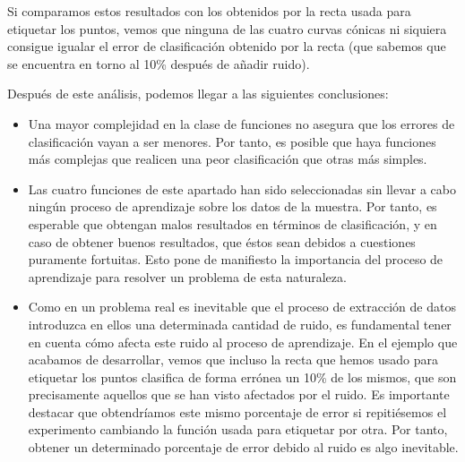 \documentclass[10pt,a4paper]{article}
\begin{document}
Si comparamos estos resultados con los obtenidos por la recta usada para etiquetar los puntos, vemos que ninguna de las cuatro curvas cónicas ni siquiera consigue igualar el error de clasificación obtenido por la recta (que sabemos que se encuentra en torno al 10\% después de añadir ruido).

Después de este análisis, podemos llegar a las siguientes conclusiones:

\begin{itemize}
	\item Una mayor complejidad en la clase de funciones no asegura que los errores de clasificación vayan a ser menores. Por tanto, es posible que haya funciones más complejas que realicen una peor clasificación que otras más simples.
	\item Las cuatro funciones de este apartado han sido seleccionadas sin llevar a cabo ningún proceso de aprendizaje sobre los datos de la muestra. Por tanto, es esperable que obtengan malos resultados en términos de clasificación, y en caso de obtener buenos resultados, que éstos sean debidos a cuestiones puramente fortuitas. Esto pone de manifiesto la importancia del proceso de aprendizaje para resolver un problema de esta naturaleza.
	\item Como en un problema real es inevitable que el proceso de extracción de datos introduzca en ellos una determinada cantidad de ruido, es fundamental tener en cuenta cómo afecta este ruido al proceso de aprendizaje. En el ejemplo que acabamos de desarrollar, vemos que incluso la recta que hemos usado para etiquetar los puntos clasifica de forma errónea un 10\% de los mismos, que son precisamente aquellos que se han visto afectados por el ruido. Es importante destacar que obtendríamos este mismo porcentaje de error si repitiésemos el experimento cambiando la función usada para etiquetar por otra. Por tanto, obtener un determinado porcentaje de error debido al ruido es algo inevitable.
\end{itemize}
\end{document}
